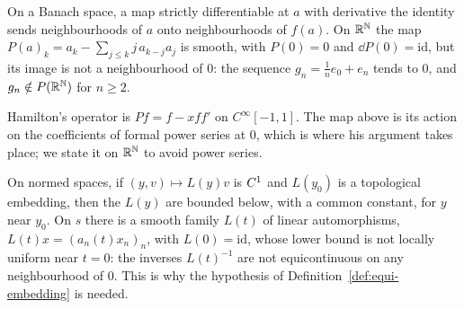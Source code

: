 \begin{example}
  \label{ex:ce-inverse-function}
  \leanok
  On a Banach space, a map strictly differentiable at $a$ with derivative the identity sends
  neighbourhoods of $a$ onto neighbourhoods of $f(a)$. On $\mathbb{R}^{\mathbb{N}}$ the map
  $P(a)_k = a_k - \sum_{j \le k} j\, a_{k-j} a_j$ is smooth, with $P(0) = 0$ and
  $\dd P(0) = \mathrm{id}$,
  but its image is not a neighbourhood of $0$: the sequence $g_n = \frac{1}{n} e_0 + e_n$ tends to
  $0$, and $g_n \notin P(\mathbb{R}^{\mathbb{N}})$ for $n \ge 2$.
\end{example}

\begin{remark}
  Hamilton's operator is $Pf = f - x f f'$ on $C^\infty[-1, 1]$. The map above is its action on the
  coefficients of formal power series at $0$, which is where his argument takes place; we state
  it on $\mathbb{R}^{\mathbb{N}}$ to avoid power series.
\end{remark}

\begin{example}
  \label{ex:ce-bounded-below}
  \leanok
  On normed spaces, if $(y, v) \mapsto L(y)v$ is $C^{1}$ and $L(y_0)$ is a topological embedding,
  then the $L(y)$ are bounded below, with a common constant, for $y$ near $y_0$. On $s$ there is a
  smooth family $L(t)$ of linear automorphisms, $L(t)x = (a_n(t) x_n)_n$, with $L(0) = \mathrm{id}$,
  whose lower bound is not locally uniform near $t = 0$: the inverses $L(t)^{-1}$ are not
  equicontinuous on any neighbourhood of $0$. This is why the hypothesis of
  Definition~\ref{def:equi-embedding} is needed.
\end{example}

